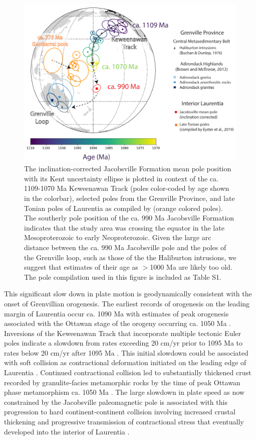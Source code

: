 \documentclass[draft]{agujournal2019}
\begin{document}
\begin{figure}[h!]
\centering
\includegraphics[width=\textwidth]{Jacobsville_pole_plot.pdf}
\caption{The inclination-corrected Jacobsville Formation mean pole position with its Kent uncertainty ellipse is plotted in context of the ca. 1109-1070 Ma Keweenawan Track (poles color-coded by age shown in the colorbar), selected poles from the Grenville Province, and late Tonian poles of Laurentia as compiled by  (orange colored poles). The southerly pole position of the ca. 990 Ma Jacobsville Formation indicates that the study area was crossing the equator in the late Mesoproterozoic to early Neoproterozoic. Given the large arc distance between the ca. 990 Ma Jacobsville pole and the poles of the Grenville loop, such as those of the the Haliburton intrusions, we suggest that estimates of their age as $>$1000 Ma \cite{Warnock2000a, Halls2015b, Evans2021b} are likely too old. The pole compilation used in this figure is included as Table S1. }
\label{fig:pole_plot}
\end{figure}

This significant slow down in plate motion is geodynamically consistent with the onset of Grenvillian orogenesis. The earliest records of orogenesis on the leading margin of Laurentia occur ca. 1090 Ma with estimates of peak orogenesis associated with the Ottawan stage of the orogeny occurring ca. 1050 Ma \cite{Rivers2012a, Swanson-Hysell2023a}. Inversions of the Keweenawan Track that incorporate multiple tectonic Euler poles indicate a slowdown from rates exceeding 20 cm/yr prior to 1095 Ma to rates below 20 cm/yr after 1095 Ma \cite{Swanson-Hysell2019a, Rose2022a}. This initial slowdown could be associated with soft collision as contractional deformation initiated on the leading edge of Laurentia \cite{Staal2020a}. Continued contractional collision led to substantially thickened crust recorded by granulite-facies metamorphic rocks by the time of peak Ottawan phase metamorphism ca. 1050 Ma \cite{Rivers2012a}. The large slowdown in plate speed as now constrained by the Jacobsville paleomagnetic pole is associated with this progression to hard continent-continent collision involving increased crustal thickening and progressive transmission of contractional stress that eventually developed into the interior of Laurentia \cite{Cannon1994a}.
\end{document}
